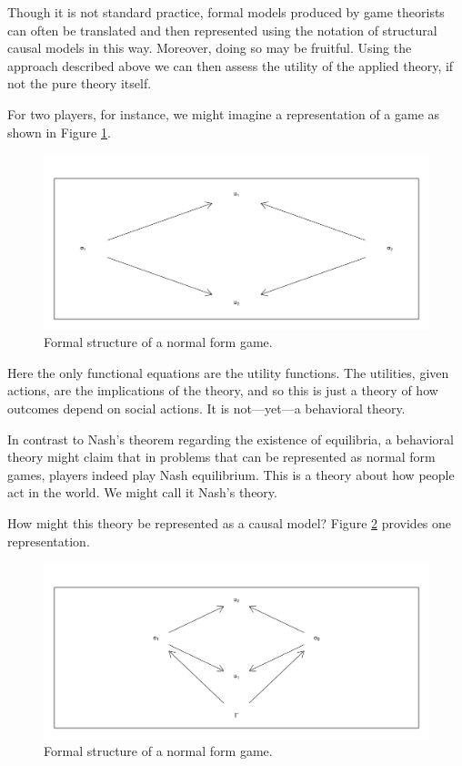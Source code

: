 \documentclass[
  12pt,
]{book}
\begin{document}
Though it is not standard practice, formal models produced by game theorists can often be translated and then represented using the notation of structural causal models in this way. Moreover, doing so may be fruitful. Using the approach described above we can then assess the utility of the applied theory, if not the pure theory itself.

For two players, for instance, we might imagine a representation of a game as shown in Figure \ref{fig:nfg}.

\begin{figure}

{\centering \includegraphics[width=0.8\linewidth]{ii_files/figure-latex/nfg-1} 

}

\caption{Formal structure of a normal form game.}\label{fig:nfg}
\end{figure}

Here the only functional equations are the utility functions. The utilities, given actions, are the implications of the theory, and so this is just a theory of how outcomes depend on social actions. It is not---yet---a behavioral theory.

In contrast to Nash's theorem regarding the existence of equilibria, a behavioral theory might claim that in problems that can be represented as normal form games, players indeed play Nash equilibrium. This is a theory about how people act in the world. We might call it Nash's theory.

How might this theory be represented as a causal model? Figure \ref{fig:nfg2} provides one representation.

\begin{figure}

{\centering \includegraphics[width=0.8\linewidth]{ii_files/figure-latex/nfg2-1} 

}

\caption{Formal structure of a normal form game.}\label{fig:nfg2}
\end{figure}
\end{document}
